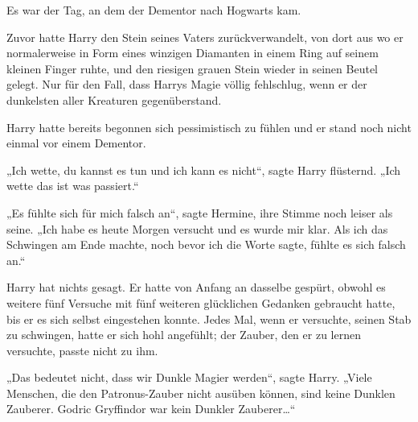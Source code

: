 Es war der Tag, an dem der Dementor nach Hogwarts kam.

Zuvor hatte Harry den Stein seines Vaters zurückverwandelt, von dort aus wo er normalerweise in Form eines winzigen Diamanten in einem Ring auf seinem kleinen Finger ruhte, und den riesigen grauen Stein wieder in seinen Beutel gelegt. Nur für den Fall, dass Harrys Magie völlig fehlschlug, wenn er der dunkelsten aller Kreaturen gegenüberstand.

Harry hatte bereits begonnen sich pessimistisch zu fühlen und er stand noch nicht einmal vor einem Dementor.

„Ich wette, du kannst es tun und ich kann es nicht“, sagte Harry flüsternd. „Ich wette das ist was passiert.“

„Es fühlte sich für mich falsch an“, sagte Hermine, ihre Stimme noch leiser als seine. „Ich habe es heute Morgen versucht und es wurde mir klar. Als ich das Schwingen am Ende machte, noch bevor ich die Worte sagte, fühlte es sich falsch an.“

Harry hat nichts gesagt. Er hatte von Anfang an dasselbe gespürt, obwohl es weitere fünf Versuche mit fünf weiteren glücklichen Gedanken gebraucht hatte, bis er es sich selbst eingestehen konnte. Jedes Mal, wenn er versuchte, seinen Stab zu schwingen, hatte er sich hohl angefühlt; der Zauber, den er zu lernen versuchte, passte nicht zu ihm.

„Das bedeutet nicht, dass wir Dunkle Magier werden“, sagte Harry. „Viele Menschen, die den Patronus-Zauber nicht ausüben können, sind keine Dunklen Zauberer. Godric Gryffindor war kein Dunkler Zauberer…“

